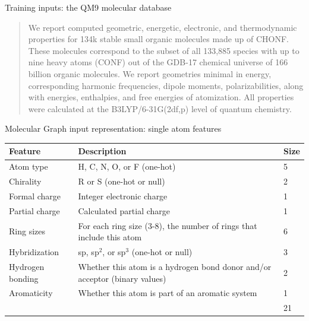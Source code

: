 \documentclass[compress]{beamer}
\newcommand\Fontsmaller{\fontsize{9pt}{10.0}\selectfont}
\begin{document}
\begin{frame}{Training inputs: the QM9 molecular database}
  \begin{quote}
    We report computed geometric, energetic, electronic, and thermodynamic properties for 134k stable small organic molecules made up of CHONF. These molecules correspond to the subset of all 133,885 species with up to nine heavy atoms (CONF) out of the GDB-17 chemical universe of 166 billion organic molecules. We report geometries minimal in energy, corresponding harmonic frequencies, dipole moments, polarizabilities, along with energies, enthalpies, and free energies of atomization. All properties were calculated at the B3LYP/6-31G(2df,p) level of quantum chemistry.
  \end{quote}
\end{frame}

\begin{frame}{Molecular Graph input representation: single atom features}
  \begin{table}[htbp]
    \centering
    \begin{tabular}{@{}lp{}l@{}}
      \toprule
      Feature & Description & Size \\ \midrule
      Atom type & H, C, N, O, or F (one-hot) & 5 \\
      Chirality & R or S (one-hot or null) & 2 \\
      Formal charge & Integer electronic charge & 1 \\
      Partial charge & Calculated partial charge & 1 \\
      Ring sizes & For each ring size (3-8), the number of rings that include this atom & 6 \\
      Hybridization & sp, sp\(^2\), or sp\(^3\) (one-hot or null) & 3 \\
      Hydrogen bonding & Whether this atom is a hydrogen bond donor and/or acceptor (binary values) & 2 \\
      Aromaticity & Whether this atom is part of an aromatic system & 1 \\ \midrule
      &  & 21 \\ \bottomrule
    \end{tabular}
  \end{table}
\end{frame}
\end{document}
